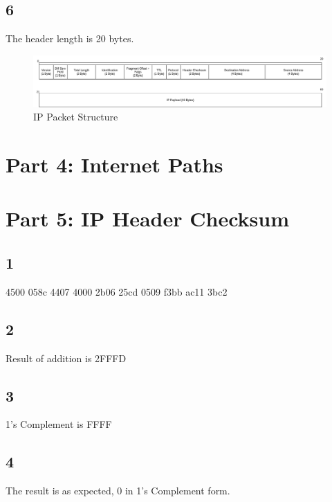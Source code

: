 \documentclass{article}
\begin{document}
    \subsection*{6}
    The header length is 20 bytes.
    \begin{figure}[htbp]
        \centering
        \includegraphics[width=\textwidth]{images/part3.drawio.png}
        \caption{IP Packet Structure}
    \end{figure}
    \section*{Part 4: Internet Paths}
    \section*{Part 5: IP Header Checksum}
    \subsection*{1}
    4500 058c 4407 4000 2b06 25cd 0509 f3bb ac11 3bc2
    \subsection*{2}
    Result of addition is 2FFFD
    \subsection*{3}
    1's Complement is FFFF
    \subsection*{4}
    The result is as expected, 0 in 1's Complement form.
\end{document}
